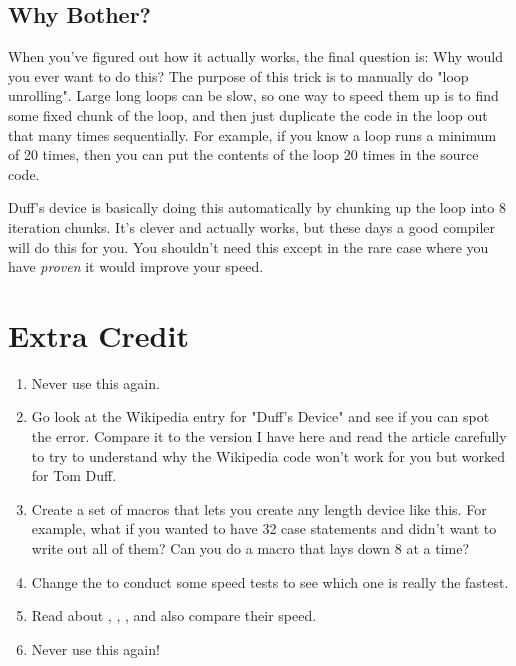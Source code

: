 \subsection{Why Bother?}

When you've figured out how it actually works, the final question is: Why would
you ever want to do this?  The purpose of this trick is to manually do "loop
unrolling".  Large long loops can be slow, so one way to speed them up is to
find some fixed chunk of the loop, and then just duplicate the code in the loop
out that many times sequentially.  For example, if you know a loop runs a
minimum of 20 times, then you can put the contents of the loop 20 times in the
source code.

Duff's device is basically doing this automatically by chunking up the loop
into 8 iteration chunks.  It's clever and actually works, but these days a good
compiler will do this for you.  You shouldn't need this except in the rare case
where you have \emph{proven} it would improve your speed.

\section{Extra Credit}

\begin{enumerate}
\item Never use this again.
\item Go look at the Wikipedia entry for "Duff's Device" and see if you can
    spot the error.  Compare it to the version I have here and read the article
    carefully to try to understand why the Wikipedia code won't work for you
    but worked for Tom Duff.
\item Create a set of macros that lets you create any length device like this.
    For example, what if you wanted to have 32 case statements and didn't want
    to write out all of them? Can you do a macro that lays down 8 at a time?
\item Change the  to conduct some speed tests to see which one is
    really the fastest.
\item Read about , , , and also compare
    their speed.
\item Never use this again!
\end{enumerate}

